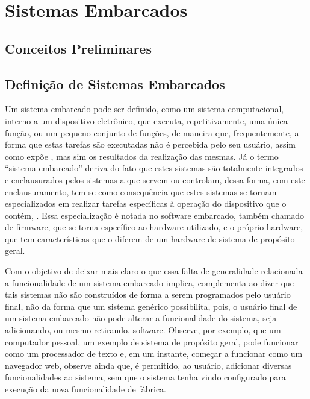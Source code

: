 \section{\textbf{Sistemas Embarcados}}
\label{sec:SistemasEmbarcados}
\subsection{\textbf{Conceitos Preliminares}}
\label{subsec:sub01_Conceitos}

\subsection{\textbf{Definição de Sistemas Embarcados}}
\label{subsec:sub01_Definicao}
Um sistema embarcado pode ser definido, como um sistema computacional, interno a um dispositivo eletrônico, que executa, repetitivamente, uma única função, ou um pequeno conjunto de funções, de maneira que, frequentemente, a forma que estas tarefas são executadas não é percebida pelo seu usuário, assim como expõe , mas sim os resultados da realização das mesmas. Já o termo “sistema embarcado” deriva do fato que estes sistemas são totalmente integrados e enclausurados pelos sistemas a que servem ou controlam, dessa forma, com este enclausuramento, tem-se como consequência que estes sistemas se tornam especializados em realizar tarefas específicas à operação do dispositivo que o contém, \cite[p.~554]{Springer2009}. Essa especialização é notada no software embarcado, também chamado de firmware, que se torna específico ao hardware utilizado, e o próprio hardware, que tem características que o diferem de um hardware de sistema de propósito geral. 

Com o objetivo de deixar mais claro o que essa falta de generalidade relacionada a funcionalidade de um sistema embarcado implica,  complementa ao dizer que tais sistemas não são construídos de forma a serem programados pelo usuário final, não da forma que um sistema genérico possibilita, pois, o usuário final de um sistema embarcado não pode alterar a funcionalidade do sistema, seja adicionando, ou mesmo retirando, software. Observe, por exemplo, que um computador pessoal, um exemplo de sistema de propósito geral, pode funcionar como um processador de texto e, em um instante, começar a funcionar como um navegador web, observe ainda que, é permitido, ao usuário, adicionar diversas funcionalidades ao sistema, sem que o sistema tenha vindo configurado para execução da nova funcionalidade de fábrica. 

